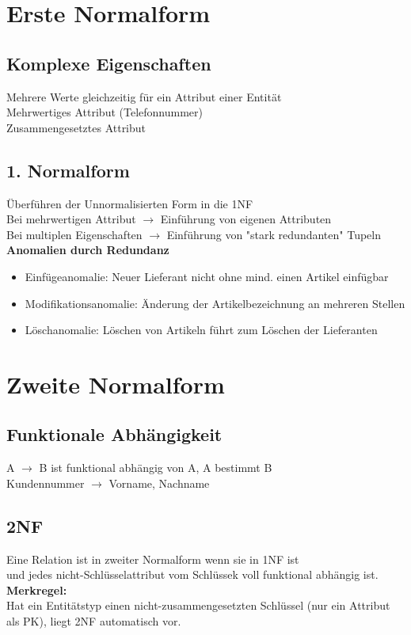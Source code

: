 \documentclass{scrreprt}
\begin{document}
\section{Erste Normalform}
\subsection{Komplexe Eigenschaften}
Mehrere Werte gleichzeitig für ein Attribut einer Entität
\\Mehrwertiges Attribut (Telefonnummer)
\\Zusammengesetztes Attribut
\subsection{1. Normalform}
Überführen der Unnormalisierten Form in die 1NF
\\Bei mehrwertigen Attribut $\rightarrow$ Einführung von eigenen Attributen
\\Bei multiplen Eigenschaften $\rightarrow$ Einführung von "stark redundanten" Tupeln
\\\textbf{Anomalien durch Redundanz}
\begin{itemize}
  \item Einfügeanomalie: Neuer Lieferant nicht ohne mind. einen Artikel einfügbar
  \item Modifikationsanomalie: Änderung der Artikelbezeichnung an mehreren Stellen
  \item Löschanomalie: Löschen von Artikeln führt zum Löschen der Lieferanten
\end{itemize}
\section{Zweite Normalform}
\subsection{Funktionale Abhängigkeit}
A $\rightarrow$ B ist funktional abhängig von A, A bestimmt B
\\Kundennummer $\rightarrow$ Vorname, Nachname
\subsection{2NF}
Eine Relation ist in zweiter Normalform wenn sie in 1NF ist 
\\und jedes nicht-Schlüsselattribut vom Schlüssek voll funktional abhängig ist.
\\\textbf{Merkregel:}
\\Hat ein Entitätstyp einen nicht-zusammengesetzten Schlüssel (nur ein Attribut als PK), liegt 2NF automatisch vor.
\end{document}
